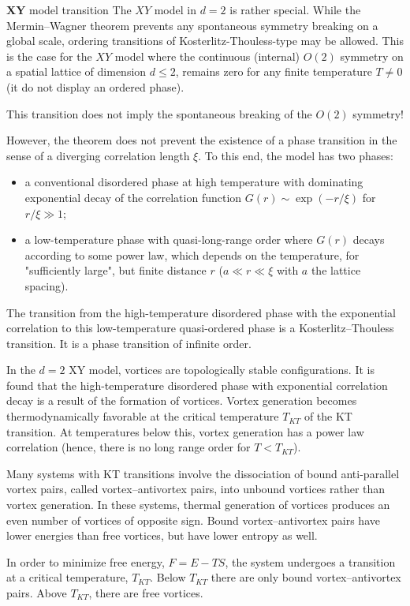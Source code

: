 \documentclass[../../Main/Main.tex]{subfiles}
\begin{document}
\begin{example}{\(\pmb{XY}\) model transition}{}
The \(XY\) model in \( d=2 \) is rather special. While the Mermin–Wagner theorem prevents any spontaneous symmetry breaking on a global scale, ordering transitions of Kosterlitz-Thouless-type may be allowed.
 This is the case for the \(XY\) model where the continuous (internal) \( O(2) \) symmetry on a spatial lattice of dimension \(d \le 2\),  remains zero for any finite temperature \( T \neq 0 \) (it do not display an ordered phase).
\begin{remark}
This transition does not imply the spontaneous breaking of the \( O(2) \) symmetry!
\end{remark} 
However, the theorem does not prevent the existence of a phase transition in the sense of a diverging correlation length \(\xi\). To this end, the model has two phases: 
\begin{itemize}
    \item a conventional disordered phase at high temperature with dominating exponential decay of the correlation function 
\(G(r)\sim \exp(-r/\xi )\) for \(r/\xi \gg 1\);
\item a low-temperature phase with quasi-long-range order where \(G(r)\) decays according to some power law, which depends on the temperature, for "sufficiently large", but finite distance \(r\) (\(a \ll r \ll \xi\) with \(a\) the lattice spacing).
\end{itemize}

The transition from the high-temperature disordered phase with the exponential correlation to this low-temperature quasi-ordered phase is a Kosterlitz–Thouless transition. It is a phase transition of infinite order.

In the \(d=2\) XY model, vortices are topologically stable configurations. It is found that the high-temperature disordered phase with exponential correlation decay is a result of the formation of vortices. Vortex generation becomes thermodynamically favorable at the critical temperature \(T_{KT}\) of the KT transition. At temperatures below this, vortex generation has a power law correlation (hence, there is no long range order for \( T<T_{KT} \)).

Many systems with KT transitions involve the dissociation of bound anti-parallel vortex pairs, called vortex–antivortex pairs, into unbound vortices rather than vortex generation. In these systems, thermal generation of vortices produces an even number of vortices of opposite sign. Bound vortex–antivortex pairs have lower energies than free vortices, but have lower entropy as well.

In order to minimize free energy, \(F=E-TS\), the system undergoes a transition at a critical temperature, \(T_{KT}\).
Below \(T_{KT}\) there are only bound vortex–antivortex pairs. Above \(T_{KT}\), there are free vortices.
\end{example}
\end{document}
